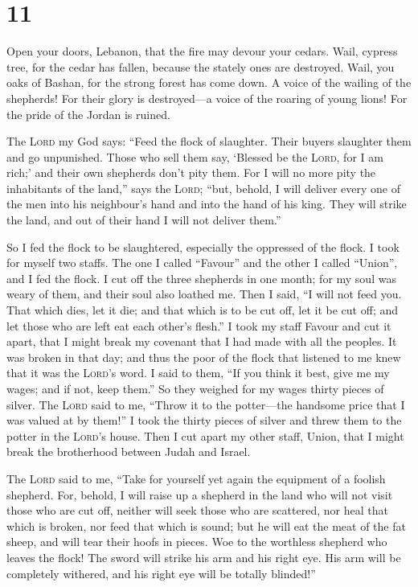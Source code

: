 \hypertarget{section-10}{%
\section{11}\label{section-10}}

 Open your doors, Lebanon, that the fire may devour your
cedars.  Wail, cypress tree, for the cedar has fallen,
because the stately ones are destroyed. Wail, you oaks of Bashan, for
the strong forest has come down.  A voice of the wailing
of the shepherds! For their glory is destroyed---a voice of the roaring
of young lions! For the pride of the Jordan is ruined.

 The \textsc{Lord} my God says: ``Feed the flock of
slaughter.  Their buyers slaughter them and go unpunished.
Those who sell them say, `Blessed be the \textsc{Lord}, for I am rich;'
and their own shepherds don't pity them.  For I will no
more pity the inhabitants of the land,'' says the \textsc{Lord}; ``but,
behold, I will deliver every one of the men into his neighbour's hand
and into the hand of his king. They will strike the land, and out of
their hand I will not deliver them.''

 So I fed the flock to be slaughtered, especially the
oppressed of the flock. I took for myself two staffs. The one I called
``Favour'' and the other I called ``Union'', and I fed the flock.
 I cut off the three shepherds in one month; for my soul
was weary of them, and their soul also loathed me.  Then I
said, ``I will not feed you. That which dies, let it die; and that which
is to be cut off, let it be cut off; and let those who are left eat each
other's flesh.''  I took my staff Favour and cut it
apart, that I might break my covenant that I had made with all the
peoples.  It was broken in that day; and thus the poor of
the flock that listened to me knew that it was the \textsc{Lord}'s word.
 I said to them, ``If you think it best, give me my
wages; and if not, keep them.'' So they weighed for my wages thirty
pieces of silver.  The \textsc{Lord} said to me, ``Throw
it to the potter---the handsome price that I was valued at by them!'' I
took the thirty pieces of silver and threw them to the potter in the
\textsc{Lord}'s house.  Then I cut apart my other staff,
Union, that I might break the brotherhood between Judah and Israel.

 The \textsc{Lord} said to me, ``Take for yourself yet
again the equipment of a foolish shepherd.  For, behold,
I will raise up a shepherd in the land who will not visit those who are
cut off, neither will seek those who are scattered, nor heal that which
is broken, nor feed that which is sound; but he will eat the meat of the
fat sheep, and will tear their hoofs in pieces.  Woe to
the worthless shepherd who leaves the flock! The sword will strike his
arm and his right eye. His arm will be completely withered, and his
right eye will be totally blinded!''

